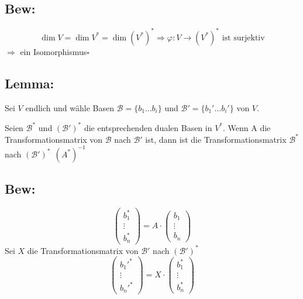 \documentclass[titlepage,12pt,a4paper,ngerman]{report}
\newenvironment{bew}[1]{\subsection{Bew: #1}}{\hfill$\square$}
\newcommand{\Bew}[2]{\begin{bew}{#1}#2\end{bew}}
\newcommand{\tx}[1]{\textrm{#1}}
\begin{document}
\Bew{}{ 
	$$\dim V = \dim V^* = \dim (V^*)^* \Rightarrow \varphi: V \to (V^*)^* \tx{ ist surjektiv} $$
	$\Rightarrow $ ein Isomorphismus}
\subsection{Lemma:}
Sei $V$ endlich und wähle Basen $\mathcal B = \{b_1 \dots b_i \}$ und $\mathcal B' = \{b_1' \dots b_i' \}$ von $V$.

Seien $ \mathcal{B}^* $ und $ (\mathcal{B}')^* $ die entsprechenden dualen Basen in $ V^* $. Wenn A die Transformationsmatrix von $ \mathcal{B} $ nach $ \mathcal{B}' $ ist, dann ist die Transformationsmatrix $ \mathcal{B^*} $ nach $ (\mathcal{B}')^* \ \ (A^*)^{-1}$
\subsection{Bew:}
$$\begin{pmatrix}
b^*_1\\
\vdots\\
b^*_n
\end{pmatrix} = A \cdot \begin{pmatrix}
b_1\\
\vdots\\
b_n
\end{pmatrix}$$
Sei $ X $ die Transformationsmatrix von $ \mathcal{B}' $ nach $ (\mathcal{B}') ^* $
$$\begin{pmatrix}
b_1'^*\\
\vdots\\
b_n'^*
\end{pmatrix} = X \cdot \begin{pmatrix}
b_1^*\\
\vdots\\
b_n^*
\end{pmatrix}$$
\end{document}
